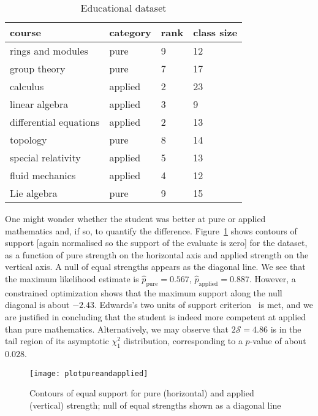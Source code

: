 \documentclass[ejs,noshowframe]{imsart}
\theoremstyle{plain}
\theoremstyle{definition}
\theoremstyle{remark}
\begin{document}
\begin{table*}[t]
  \caption{Educational dataset}
\label{educationtable}
\begin{tabular}{llll}
\hline
                   course&category   &rank&class size\\ \hline
      rings and modules  &  pure     & 9  &      12\\
           group theory  &  pure     & 7  &      17\\
               calculus  & applied   & 2  &      23\\
         linear algebra  & applied   & 3  &       9\\
 differential equations  & applied   & 2  &      13\\
               topology  &   pure    & 8  &      14\\
     special relativity  & applied   & 5  &      13\\
        fluid mechanics  & applied   & 4  &      12\\
            Lie algebra  &   pure    & 9  &      15\\
     \hline
\end{tabular}
\end{table*}

One might wonder whether the student was better at pure or applied
mathematics and, if so, to quantify the difference.
Figure~\ref{plotpureandapplied} shows contours of support [again
  normalised so the support of the evaluate is zero] for the dataset,
as a function of pure strength on the horizontal axis and applied
strength on the vertical axis.  A null of equal strengths appears as
the diagonal line.  We see that the maximum likelihood estimate is
$\hat{p}_\mathrm{pure}=0.567$, $\hat{p}_\mathrm{applied}=0.887$.
However, a constrained optimization shows that the maximum support
along the null diagonal is about $-2.43$.  Edwards's two units of
support criterion~\cite{edwards1972} is met, and we are justified in
concluding that the student is indeed more competent at applied than
pure mathematics.  Alternatively, we may observe that
$2\mathcal{S}=4.86$ is in the tail region of its asymptotic $\chi^2_1$
distribution, corresponding to a $p$-value of about $0.028$.

\begin{figure}
\texttt{[image: plotpureandapplied]}  %
\caption{Contours of equal support for pure (horizontal) and applied
  (vertical) strength; null of equal strengths shown as a diagonal
  line  \label{plotpureandapplied}}
\end{figure}
\end{document}
